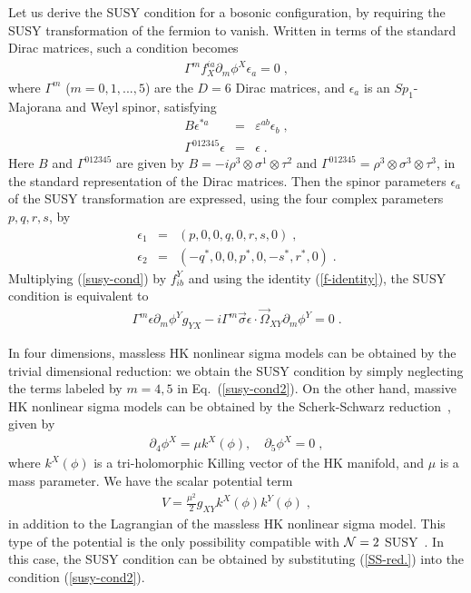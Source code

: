 \documentclass[a4paper,12pt]{article}
\begin{document}
Let us derive the SUSY condition 
for a bosonic configuration, 
by requiring the SUSY transformation of the fermion to vanish.
Written in terms of the standard Dirac matrices, 
such a condition becomes
\begin{eqnarray}
  \Gamma^m f^{i a}_X \partial _m \phi^X \epsilon _a =0 \;,
  \label{susy-cond}
\end{eqnarray} 
where $\Gamma ^m$ ($m=0,1,...,5$) are 
the $D=6$ Dirac matrices, 
and $\epsilon_a$ is an $Sp_1$-Majorana and Weyl spinor, 
satisfying 
\begin{eqnarray}
  B \epsilon ^{*a} &=& \varepsilon ^{ab}\epsilon _b \;, \\
  \Gamma ^{012345}\epsilon &=& \epsilon \;.
\end{eqnarray} 
Here $B$ and $\Gamma^{012345}$ are given by 
$B=-i\rho^3\otimes \sigma^1\otimes \tau^2$ and 
$\Gamma^{012345}=\rho^3\otimes \sigma^3\otimes \tau^3$, 
in the standard representation of the Dirac matrices.
Then the spinor parameters $\epsilon_a$ of 
the SUSY transformation are expressed, 
using the four complex parameters $p,q,r,s$, by 
\begin{eqnarray}
  \epsilon_1 &=& (p,0,0,q,0,r,s,0) \;, \nonumber \\
  \epsilon_2 &=& (-q^*,0,0,p^*,0,-s^*,r^*,0) \;. 
\label{eq:susy_parameters}
\end{eqnarray}
Multiplying (\ref{susy-cond}) by $f^Y_{ib}$ and using the identity 
(\ref{f-identity}), the SUSY condition is equivalent to \cite{Townsend1}
\begin{eqnarray}
  \Gamma ^m \epsilon \partial _m\phi^Y g_{YX}
    -i\Gamma ^m \vec{\sigma}\epsilon
    \cdot \vec{\Omega}_{XY}\partial _m\phi^Y = 0 \;.
\label{susy-cond2}
\end{eqnarray} 

In four dimensions, 
massless HK nonlinear sigma models can be obtained by 
the trivial dimensional reduction:   
we obtain the SUSY condition by simply 
neglecting the terms labeled by $m=4,5$ in Eq.~(\ref{susy-cond2}).  
On the other hand, massive HK nonlinear sigma models 
can be obtained by the Scherk-Schwarz reduction~\cite{AF1,Sierra,Townsend1}, 
given by  
\begin{eqnarray}
  \partial_4\phi^X = \mu k^X(\phi), \quad \partial_5\phi^X = 0\;, 
 \label{SS-red.}
\end{eqnarray}
where $k^X(\phi)$ is a tri-holomorphic Killing vector of 
the HK manifold, and $\mu$ is a mass parameter. 
We have the scalar potential term  
\begin{eqnarray}
  V = \frac{\mu^2}{2}g_{XY}k^X (\phi) k^Y (\phi) \;,
 \label{HK-pot.}
\end{eqnarray}
in addition to the Lagrangian of the massless HK nonlinear sigma model. 
This type of the potential is the only possibility 
compatible with ${\cal N}=2$ SUSY~\cite{Townsend1}.
In this case, the SUSY condition can be obtained by 
substituting (\ref{SS-red.}) into the condition (\ref{susy-cond2}).
\end{document}
